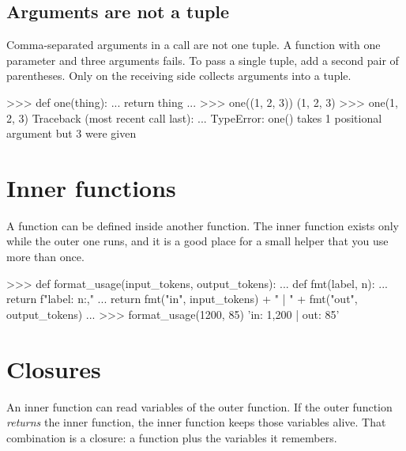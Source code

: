 \subsection{Arguments are not a tuple}

Comma-separated arguments in a call are not one tuple. A function with one parameter and three
arguments fails. To pass a single tuple, add a second pair of parentheses. Only 
on the receiving side collects arguments into a tuple.

\begin{pycode}
>>> def one(thing):
...     return thing
...
>>> one((1, 2, 3))
(1, 2, 3)
>>> one(1, 2, 3)
Traceback (most recent call last):
  ...
TypeError: one() takes 1 positional argument but 3 were given
\end{pycode}

\section{Inner functions}

A function can be defined inside another function. The inner function exists only while the
outer one runs, and it is a good place for a small helper that you use more than once.

\begin{pycode}
>>> def format_usage(input_tokens, output_tokens):
...     def fmt(label, n):
...         return f"{label}: {n:,}"
...     return fmt("in", input_tokens) + " | " + fmt("out", output_tokens)
...
>>> format_usage(1200, 85)
'in: 1,200 | out: 85'
\end{pycode}

\section{Closures}

An inner function can read variables of the outer function. If the outer function
\emph{returns} the inner function, the inner function keeps those variables alive. That
combination is a closure: a function plus the variables it remembers.

